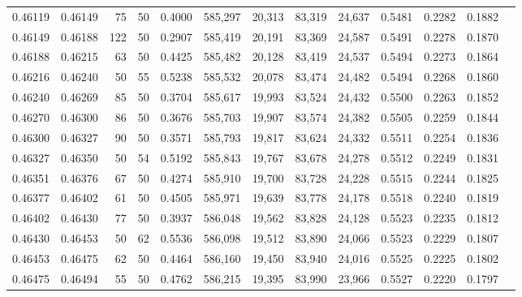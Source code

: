\begin{tabular}{rrrrrrrrrrrrr}
0.46119 & 0.46149 &    75 &  50 &                                     0.4000 & 585,297 &  20,313 &  83,319 &  24,637 & 0.5481 & 0.2282 & 0.1882 \\
0.46149 & 0.46188 &   122 &  50 &                                     0.2907 & 585,419 &  20,191 &  83,369 &  24,587 & 0.5491 & 0.2278 & 0.1870 \\
0.46188 & 0.46215 &    63 &  50 &                                     0.4425 & 585,482 &  20,128 &  83,419 &  24,537 & 0.5494 & 0.2273 & 0.1864 \\
0.46216 & 0.46240 &    50 &  55 &                                     0.5238 & 585,532 &  20,078 &  83,474 &  24,482 & 0.5494 & 0.2268 & 0.1860 \\
0.46240 & 0.46269 &    85 &  50 &                                     0.3704 & 585,617 &  19,993 &  83,524 &  24,432 & 0.5500 & 0.2263 & 0.1852 \\
0.46270 & 0.46300 &    86 &  50 &                                     0.3676 & 585,703 &  19,907 &  83,574 &  24,382 & 0.5505 & 0.2259 & 0.1844 \\
0.46300 & 0.46327 &    90 &  50 &                                     0.3571 & 585,793 &  19,817 &  83,624 &  24,332 & 0.5511 & 0.2254 & 0.1836 \\
0.46327 & 0.46350 &    50 &  54 &                                     0.5192 & 585,843 &  19,767 &  83,678 &  24,278 & 0.5512 & 0.2249 & 0.1831 \\
0.46351 & 0.46376 &    67 &  50 &                                     0.4274 & 585,910 &  19,700 &  83,728 &  24,228 & 0.5515 & 0.2244 & 0.1825 \\
0.46377 & 0.46402 &    61 &  50 &                                     0.4505 & 585,971 &  19,639 &  83,778 &  24,178 & 0.5518 & 0.2240 & 0.1819 \\
0.46402 & 0.46430 &    77 &  50 &                                     0.3937 & 586,048 &  19,562 &  83,828 &  24,128 & 0.5523 & 0.2235 & 0.1812 \\
0.46430 & 0.46453 &    50 &  62 &                                     0.5536 & 586,098 &  19,512 &  83,890 &  24,066 & 0.5523 & 0.2229 & 0.1807 \\
0.46453 & 0.46475 &    62 &  50 &                                     0.4464 & 586,160 &  19,450 &  83,940 &  24,016 & 0.5525 & 0.2225 & 0.1802 \\
0.46475 & 0.46494 &    55 &  50 &                                     0.4762 & 586,215 &  19,395 &  83,990 &  23,966 & 0.5527 & 0.2220 & 0.1797 \\

\end{tabular}
